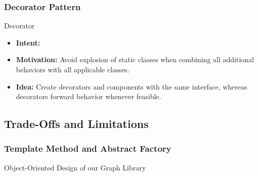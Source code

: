 \subsubsection{Decorator Pattern}
\begin{frame}{\myframetitle}
	\begin{fancycolumns}[widths={45}]
		\begin{definition}{Decorator }
			\begin{itemize}
				\item {\bf Intent:} 
				\item {\bf Motivation:} Avoid explosion of static classes when combining all additional behaviors with all applicable classes.
				\item {\bf Idea:} Create decorators and components with the same interface, whereas decorators forward behavior whenever feasible.
			\end{itemize}
		\end{definition}
	\nextcolumn
		\begin{exampletight}{}
		\end{exampletight}
	\end{fancycolumns}
\end{frame}

\subsection{Trade-Offs and Limitations}

\subsubsection{Template Method and Abstract Factory}
\begin{frame}{Object-Oriented Design of our Graph Library}
	\begin{fancycolumns}[widths={40}]
	\nextcolumn
	\end{fancycolumns}
\end{frame}

